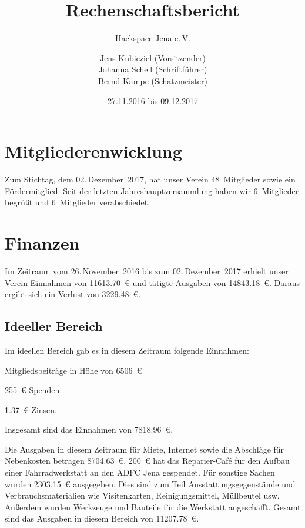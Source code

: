 \documentclass[ngerman]{scrartcl}
\title{Rechenschaftsbericht}
\subtitle{Hackspace Jena e.\,V.}
\author{%
	Jens Kubieziel (Vorsitzender)\\
	Johanna Schell (Schriftführer)\\
	Bernd Kampe (Schatzmeister)
}
\date{27.11.2016 bis 09.12.2017}
\begin{document}
\maketitle{}

\tableofcontents{}

\newpage{}

\section{Mitgliederenwicklung}

Zum Stichtag, dem 02.\,Dezember~2017, hat unser Verein 48~Mitglieder sowie ein Fördermitglied.
Seit der letzten Jahreshauptversammlung haben wir 6~Mitglieder begrüßt und 6~Mitglieder verabschiedet.


\section{Finanzen}

Im Zeitraum vom 26.\,November~2016 bis zum 02.\,Dezember~2017 erhielt unser Verein Einnahmen von \num{11613,70}~\euro{} und tätigte Ausgaben von \num{14843,18}~\euro{}.  %
Daraus ergibt sich ein Verlust von \num{3229,48}~\euro{}. %


\subsection{Ideeller Bereich}
\label{sec:ideeller_bereich}

Im ideellen Bereich gab es in diesem Zeitraum folgende Einnahmen:
\begin{compactitem}
\item Mitgliedsbeiträge in Höhe von \num{6506}~\euro{}
\item \num{255}~\euro{} Spenden
\item \num{1,37}~\euro{} Zinsen. %
\end{compactitem}
Insgesamt sind das Einnahmen von \num{7818,96}~\euro{}. %

Die Ausgaben in diesem Zeitraum für Miete, Internet sowie die Abschläge für Nebenkosten betragen \num{8704,63}~\euro{}.
\num{200}~\euro{} hat das Reparier-Café für den Aufbau einer Fahrradwerkstatt an den ADFC Jena gespendet.
Für sonstige Sachen wurden \num{2303,15}~\euro{} ausgegeben.
Dies sind zum Teil Ausstattungsgegenstände und Verbrauchsmaterialien wie Visitenkarten, Reinigungsmittel, Müllbeutel usw.
Außerdem wurden Werkzeuge und Bauteile für die Werkstatt angeschafft.
Gesamt sind das Ausgaben in diesem Bereich von \num{11207,78}~\euro{}.
\end{document}
